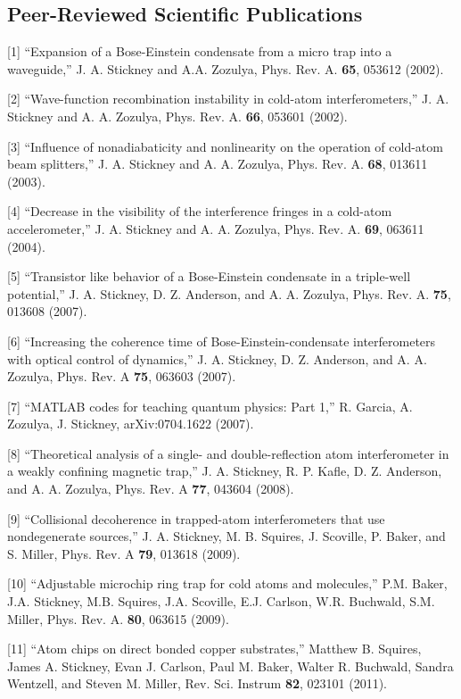 \documentclass[overlapped,line,letterpaper]{res}
\begin{document}
\begin{resume}
\section{\bf Peer-Reviewed Scientific Publications}

[1] ``Expansion of a {B}ose-{E}instein condensate from a micro trap into a waveguide,'' J. A. Stickney and A.A. Zozulya,
 Phys. Rev. A. \textbf{65}, 053612 (2002).

[2] ``Wave-function recombination instability in cold-atom interferometers,'' J. A. Stickney and A. A. Zozulya,
Phys. Rev. A. \textbf{66}, 053601 (2002).

[3] ``Influence of nonadiabaticity and nonlinearity on the operation of cold-atom beam splitters,'' J. A. Stickney and A. A. Zozulya,
Phys. Rev. A. \textbf{68}, 013611 (2003).

[4] ``Decrease in the visibility of the interference fringes in a cold-atom accelerometer,'' J. A. Stickney and A. A. Zozulya,
Phys. Rev. A. \textbf{69}, 063611 (2004).

[5] ``Transistor like behavior of a {B}ose-{E}instein condensate in a triple-well potential,'' J. A. Stickney, D. Z. Anderson, and A. A. Zozulya,
Phys. Rev. A. \textbf{75}, 013608 (2007).

[6] ``Increasing the coherence time of {B}ose-{E}instein-condensate interferometers with optical control of dynamics,'' J. A. Stickney, D. Z. Anderson, and A. A. Zozulya, Phys. Rev. A \textbf{75}, 063603 (2007).

[7] ``MATLAB codes for teaching quantum physics: Part 1,'' R. Garcia, A. Zozulya, J. Stickney, arXiv:0704.1622 (2007).

[8] ``Theoretical analysis of a single- and double-reflection atom interferometer in a weakly confining magnetic trap,''
J. A. Stickney, R. P. Kafle, D. Z. Anderson, and A. A. Zozulya, Phys. Rev. A \textbf{77}, 043604 (2008).

[9] ``Collisional decoherence in trapped-atom interferometers that use nondegenerate sources,'' J. A. Stickney,
M. B. Squires, J. Scoville, P. Baker, and S. Miller, Phys. Rev. A \textbf{79}, 013618 (2009).

[10] ``Adjustable microchip ring trap for cold atoms and molecules,''
P.M. Baker, J.A. Stickney, M.B. Squires, J.A. Scoville, E.J. Carlson, W.R. Buchwald, S.M. Miller,
Phys. Rev. A. \textbf{80}, 063615 (2009).

[11] ``Atom chips on direct bonded copper substrates,'' Matthew B. Squires, James A. Stickney, Evan J. Carlson, Paul M. Baker, Walter R. Buchwald, Sandra Wentzell, and Steven M. Miller,
Rev. Sci. Instrum \textbf{82}, 023101 (2011).


\end{resume}
\end{document}
